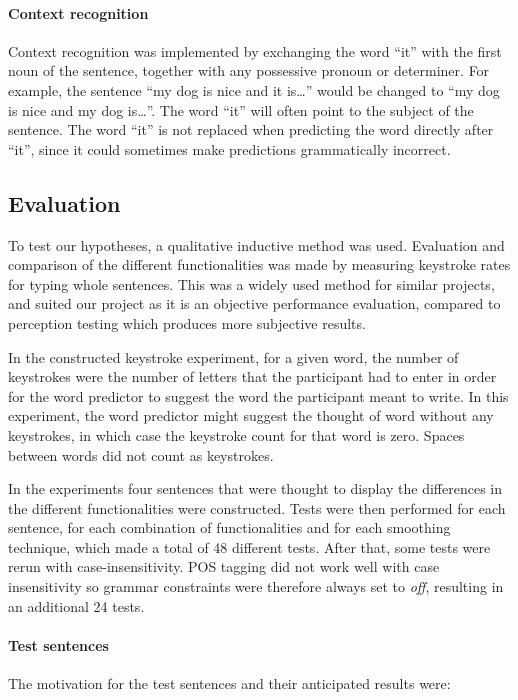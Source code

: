 \paragraph{Context recognition}
Context recognition was implemented by exchanging the word “it” with the first noun of the sentence, together with any possessive pronoun or determiner. For example, the sentence “my dog is nice and it is…” would be changed to “my dog is nice and my dog is…”. The word “it” will often point to the subject of the sentence. The word “it” is not replaced when predicting the word directly after “it”, since it could sometimes make predictions grammatically incorrect.

\subsection{Evaluation}
To test our hypotheses, a qualitative inductive method was used. Evaluation and comparison of the different functionalities was made by measuring keystroke rates for typing whole sentences. This was a widely used method for similar projects\cite{keystrokes}, and suited our project as it is an objective performance evaluation, compared to perception testing which produces more subjective results.

In the constructed keystroke experiment, for a given word, the number of keystrokes were the number of letters that the participant had to enter in order for the word predictor to suggest the word the participant meant to write. In this experiment, the word predictor might suggest the thought of word without any keystrokes, in which case the keystroke count for that word is zero. Spaces between words did not count as keystrokes.

In the experiments four sentences that were thought to display the differences in the different functionalities were constructed. Tests were then performed for each sentence, for each combination of functionalities and for each smoothing technique, which made a total of 48 different tests. After that, some tests were rerun with case-insensitivity. POS tagging did not work well with case insensitivity so grammar constraints were therefore always set to \emph{off}, resulting in an additional 24 tests.

\paragraph{Test sentences}
The motivation for the test sentences and their anticipated results were:

